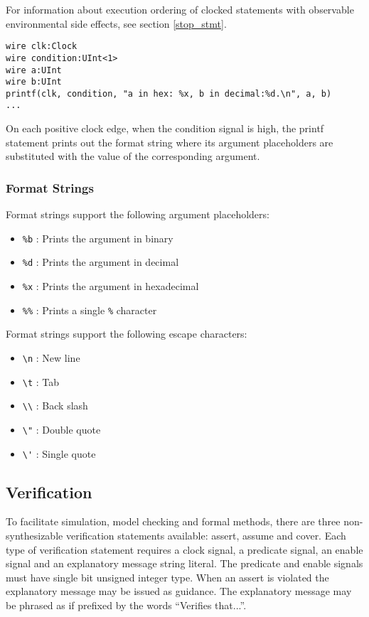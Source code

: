 \documentclass[12pt]{article}
\begin{document}
For information about execution ordering of clocked statements with observable environmental side
effects, see section \ref{stop_stmt}.

\begin{lstlisting}
wire clk:Clock
wire condition:UInt<1>
wire a:UInt
wire b:UInt
printf(clk, condition, "a in hex: %x, b in decimal:%d.\n", a, b)
...
\end{lstlisting}

On each positive clock edge, when the condition signal is high, the printf statement prints out the format string where its argument placeholders are substituted with the value of the corresponding argument.

\subsubsection{Format Strings}

Format strings support the following argument placeholders:
\begin{itemize}
\item \verb|%b| : Prints the argument in binary
\item \verb|%d| : Prints the argument in decimal
\item \verb|%x| : Prints the argument in hexadecimal
\item \verb|%%| : Prints a single \verb|%| character
\end{itemize}

Format strings support the following escape characters:
\begin{itemize}
\item \verb|\n| : New line
\item \verb|\t| : Tab
\item \verb|\\| : Back slash
\item \verb|\"| : Double quote
\item \verb|\'| : Single quote
\end{itemize}

\subsection{Verification}

To facilitate simulation, model checking and formal methods, there are three non-synthesizable verification statements available: assert, assume and cover. Each type of verification statement requires a clock signal, a predicate signal, an enable signal and an explanatory message string literal. The predicate and enable signals must have single bit unsigned integer type. When an assert is violated the explanatory message may be issued as guidance. The explanatory message may be phrased as if prefixed by the words ``Verifies that...''.
\end{document}
